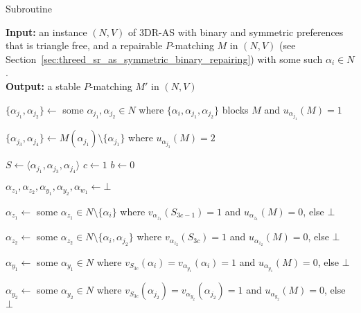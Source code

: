 \begin{breakablealgorithm}
\caption{Subroutine~}
\textbf{Input:} an instance $(N, V)$ of 3DR-AS with binary and symmetric preferences that is triangle free, and a repairable $P$-matching $M$ in $(N, V)$ (see Section~\ref{sec:threed_sr_as_symmetric_binary_repairing}) with some such $\alpha_i \in N$.\\
\textbf{Output:} a stable $P$-matching $M'$ in $(N, V)$
\smallskip
\begin{algorithmic}
\label{alg:threed_sr_as_almostthere_algo}
\State $\{ \alpha_{j_1}, \alpha_{j_2} \} \gets$ some $\alpha_{j_1}, \alpha_{j_2}\in N$ where $\{ \alpha_i, \alpha_{j_1}, \alpha_{j_2}\}$ blocks $M$ and $u_{\alpha_{j_1}}(M)=1$

\State $\{ \alpha_{j_3}, \alpha_{j_4} \} \gets M(\alpha_{j_1}) \setminus \{ \alpha_{{j_1}} \}$ where $u_{\alpha_{{j_3}}}(M)=2$

\smallskip

\State $S \gets \langle \alpha_{j_1}, \alpha_{j_3}, \alpha_{j_4} \rangle$
\State $c \gets 1$
\State $b \gets 0$

\State $\alpha_{z_1}, \alpha_{z_2}, \alpha_{y_1}, \alpha_{y_2}, \alpha_{w_1} \gets \bot$

\smallskip


\State $\alpha_{z_1} \gets$ some $\alpha_{z_1}\in N \setminus \{ \alpha_i \}$ where $v_{\alpha_{z_1}}(S_{3c-1})=1 $ and $u_{\alpha_{z_1}}(M)=0$, else $\bot$

\vspace*{1.5pt}

\State $\alpha_{z_2} \gets$ some $\alpha_{z_2}\in N \setminus \{ \alpha_i, \alpha_{j_2} \}$ where $v_{\alpha_{z_2}}(S_{3c})=1 $ and $ u_{\alpha_{z_2}}(M)=0$, else $\bot$

\vspace*{1.5pt}

\State $\alpha_{y_1} \gets$ some $\alpha_{y_1}\in N$ where $v_{S_{3c}}(\alpha_i)=v_{\alpha_{y_1}}(\alpha_i)=1 $ and $u_{\alpha_{y_1}}(M)=0$, else $\bot$

\vspace*{1.5pt}

\State $\alpha_{y_2} \gets$ some $\alpha_{y_2}\in N$ where $v_{S_{3c}}(\alpha_{j_2})=v_{\alpha_{y_2}}(\alpha_{j_2})=1 $ and $u_{\alpha_{y_2}}(M)=0$, else $\bot$


\end{algorithmic}
\end{breakablealgorithm}
